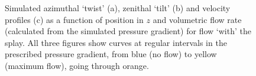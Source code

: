 \begin{figure}
\begin{center}
\end{center}
\caption[Simulated twist, tilt and velocity profiles for flow `with' the splay]{\label{fig:splayed_with_twist_tilt_profile}Simulated azimuthal `twist' (a), zenithal `tilt' (b) and velocity profiles (c) as a function of position in $z$ and volumetric flow rate (calculated from the simulated pressure gradient) for flow `with' the splay. All three figures show curves at regular intervals in the prescribed pressure gradient, from blue (no flow) to yellow (maximum flow), going through orange.}
\end{figure}

